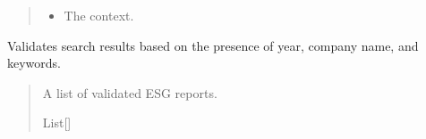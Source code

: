 \documentclass[letterpaper,10pt,english]{sphinxmanual}
\begin{document}
\begin{fulllineitems}
\begin{fulllineitems}
\begin{quote}
\begin{description}
\begin{itemize}
\item {} 
\sphinxAtStartPar
{} \textendash{} The context.

\end{itemize}

\end{description}\end{quote}

\end{fulllineitems}


\begin{fulllineitems}
\label{\detokenize{src.esg_reports:src.esg_reports.validate.SearchResultValidator.search_results}}
\pysigstartsignatures
\pysigline
{}
\pysigstopsignatures
\end{fulllineitems}


\begin{fulllineitems}
\label{\detokenize{src.esg_reports:src.esg_reports.validate.SearchResultValidator.validated_results}}
\pysigstartsignatures
\pysigline
{}
\pysigstopsignatures
\sphinxAtStartPar
Validates search results based on the presence of year, company name, and keywords.
\begin{quote}\begin{description}
\sphinxAtStartPar
A list of validated ESG reports.

\sphinxAtStartPar
List{[}{\hyperref[\detokenize{src.data_models:src.data_models.company.ESGReport}]{}}{]}


\end{description}
\end{quote}
\end{fulllineitems}
\end{fulllineitems}
\end{document}
